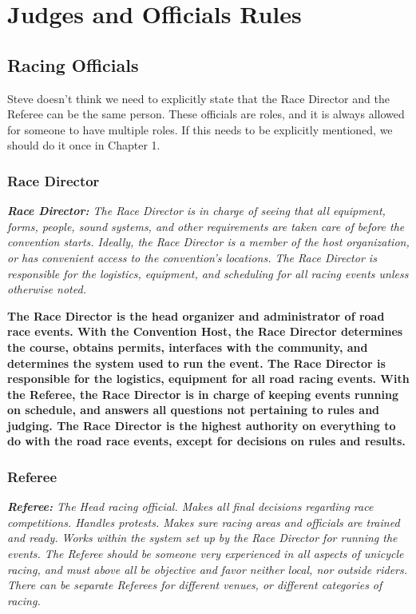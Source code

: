 \chapter{Judges and Officials Rules}

\section{Racing Officials}

\begin{framed}
Steve doesn't think we need to explicitly state that the Race Director and the Referee can be the same person.  These officials are roles, and it is always allowed for someone to have multiple roles.  If this needs to be explicitly mentioned, we should do it once in Chapter 1.
\end{framed}

\subsection{Race Director}

\textit{\textbf{Race Director:} The Race Director is in charge of seeing that all equipment, forms, people, sound systems, and other requirements are taken care of before the convention starts.
Ideally, the Race Director is a member of the host organization, or has convenient access to the convention's locations.
The Race Director is responsible for the logistics, equipment, and scheduling for all racing events unless otherwise noted.}

\textbf{The Race Director is the head organizer and administrator of road race
events.  With the Convention Host, the Race Director determines the course,
obtains permits, interfaces with the community, and determines the system
used to run the event.  The Race Director is responsible for the logistics,
equipment for all road racing events.  With the Referee, the
Race Director is in charge of keeping events running on schedule, and
answers all questions not pertaining to rules and judging.  The Race
Director is the highest authority on everything to do with the road race
events, except for decisions on rules and results.}

\subsection{Referee}

\textit{\textbf{Referee:} The Head racing official.
Makes all final decisions regarding race competitions.
Handles protests.
Makes sure racing areas and officials are trained and ready.
Works within the system set up by the Race Director for running the events.
The Referee should be someone very experienced in all aspects of unicycle racing, and must above all be objective and favor neither local, nor outside riders.
There can be separate Referees for different venues, or different categories of racing.}

